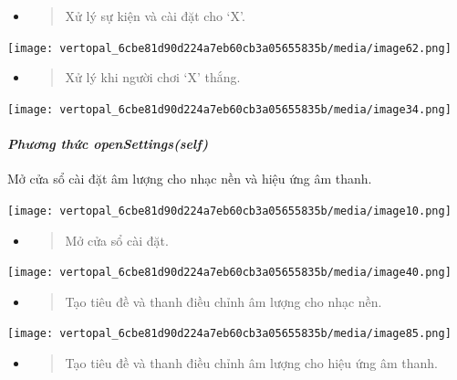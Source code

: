 \documentclass[a4paper]{article}
\begin{document}
\begin{itemize}
\item
  \begin{quote}
  Xử lý sự kiện và cài đặt cho `X'.
  \end{quote}
\end{itemize}

\texttt{[image: vertopal\_6cbe81d90d224a7eb60cb3a05655835b/media/image62.png]}

\begin{itemize}
\item
  \begin{quote}
  Xử lý khi người chơi `X' thắng.
  \end{quote}
\end{itemize}

\texttt{[image: vertopal\_6cbe81d90d224a7eb60cb3a05655835b/media/image34.png]}

\hypertarget{phux1b0ux1a1ng-thux1ee9c-opensettingsself}{%
\paragraph{\texorpdfstring{\emph{\textbf{} Phương thức
openSettings(self)}
}{Phương thức openSettings(self) }}\label{phux1b0ux1a1ng-thux1ee9c-opensettingsself}}

Mở cửa sổ cài đặt âm lượng cho nhạc nền và hiệu ứng âm thanh.

\texttt{[image: vertopal\_6cbe81d90d224a7eb60cb3a05655835b/media/image10.png]}

\begin{itemize}
\item
  \begin{quote}
  Mở cửa sổ cài đặt.
  \end{quote}
\end{itemize}

\texttt{[image: vertopal\_6cbe81d90d224a7eb60cb3a05655835b/media/image40.png]}

\begin{itemize}
\item
  \begin{quote}
  Tạo tiêu đề và thanh điều chỉnh âm lượng cho nhạc nền.
  \end{quote}
\end{itemize}

\texttt{[image: vertopal\_6cbe81d90d224a7eb60cb3a05655835b/media/image85.png]}

\begin{itemize}
\item
  \begin{quote}
  Tạo tiêu đề và thanh điều chỉnh âm lượng cho hiệu ứng âm thanh.
  \end{quote}
\end{itemize}
\end{document}
